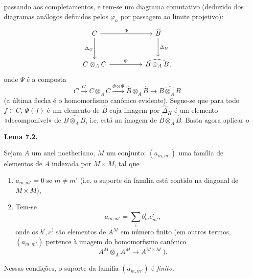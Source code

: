 passando aos completamentos, e tem-se um diagrama
comutativo (deduzido dos diagramas análogos definidos
pelos \(\varphi_n\) por passagem ao limite projetivo):
\[
\begin{tikzcd}[column sep=huge,row sep=large]
 C \arrow[r,"\Phi"] \arrow[d,"\Delta_G"']
 & \widehat B \arrow[d,"\Delta_H"]\\
 C\otimes_A C \arrow[r,"\Psi"]
 & \widehat{B\otimes_A B},
\end{tikzcd}
\]
onde \(\Psi\) é a composta
\[
 C\xrightarrow{G}C\otimes_A C
 \xrightarrow{\Phi\otimes\Phi}\widehat B\otimes_A\widehat B
 \longrightarrow\widehat{B\otimes_A B}
\]
(a última flecha é o homomorfismo canônico evidente).
Segue-se que para todo \(f\in C\), \(\Phi(f)\) é um
elemento de \(\widehat B\) cuja imagem por
\(\widehat\Delta_H\) é um elemento «decomponível» de
\(\widehat{B\otimes_AB}\), i.e. está na imagem de
\(\widehat B\otimes_A\widehat B\). Basta agora aplicar o

\medskip
\noindent{}\textbf{Lema 7.2.}
\begin{itshape}
Sejam \(A\) um anel noetheriano, \(M\) um conjunto;
\((a_{m,m'})\) uma família de elementos de \(A\) indexada
por \(M\times M\), tal que
\begin{enumerate}
  \item[(i)] 
  \(a_{m,m'}=0\) se \(m\neq m'\) (i.e. o suporte da
  família está contido na diagonal de \(M\times M\)),

  \item[(ii)] 
  Tem-se
  \[
    a_{m,m'}=\sum_i b_m^ic_{m'}^i,
  \]
  onde os \(b^i,c^i\) são elementos de \(A^M\) em número
  finito (em outros termos, \((a_{m,m'})\) pertence à
  imagem do homomorfismo canônico
  \[
    A^M\otimes_AA^M\longrightarrow A^{M\times M}\;).
  \]
\end{enumerate}
\end{itshape}

Nessas condições, o suporte da família \((a_{m,m'})\)
é \emph{finito}.

